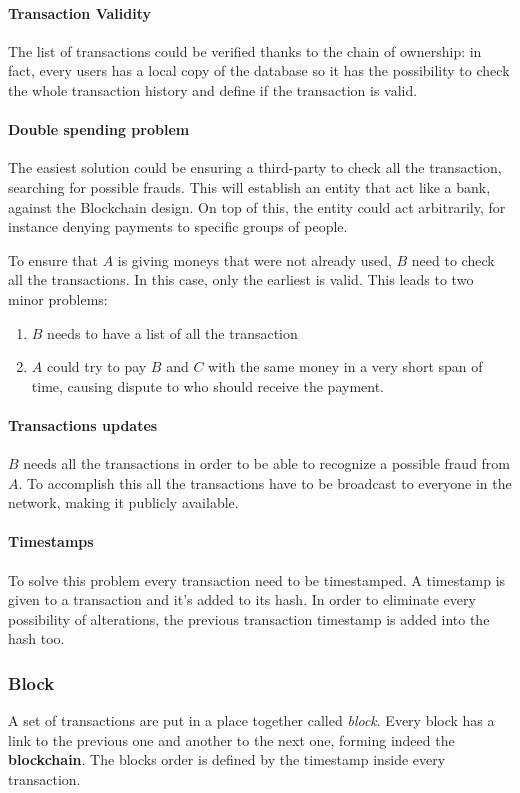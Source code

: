 \paragraph*{Transaction Validity}
The list of transactions could be verified thanks to the chain of ownership:
in fact, every users has a local copy of the database so it has the possibility
to check the whole transaction history and define if the transaction is valid.

\paragraph*{Double spending problem}
The easiest solution could be ensuring a third-party to check all the
transaction, searching for possible frauds. This will establish an entity
that act like a bank, against the Blockchain design. On top of this,
the entity could act arbitrarily, for instance denying payments to specific
groups of people.

To ensure that $A$ is giving moneys that were not already used, $B$ need to
check all the transactions. In this case, only the earliest is
valid\cite{nakamoto08}. This leads to two minor problems:
\begin{enumerate}
 \item $B$ needs to have a list of all the transaction
 \item $A$ could try to pay $B$ and $C$ with the same money in a very short
span of time, causing dispute to who should receive the payment.
\end{enumerate}

\paragraph*{Transactions updates}
\label{TU}
$B$ needs all the transactions in order to be able to recognize a possible
fraud from $A$. To accomplish this all the transactions have to be broadcast to
everyone in the network, making it publicly available.

\paragraph*{Timestamps}
To solve this problem every transaction need to be timestamped. A timestamp is
given to a transaction and it's added to its hash. In order to eliminate every
possibility of alterations, the previous transaction timestamp is added into
the hash too.

\subsubsection{Block}
A set of transactions are put in a place together called \textit{block}. Every
block has a link to the previous one and another to the next one, forming
indeed the \textbf{blockchain}.
The blocks order is defined by the timestamp inside every transaction.

